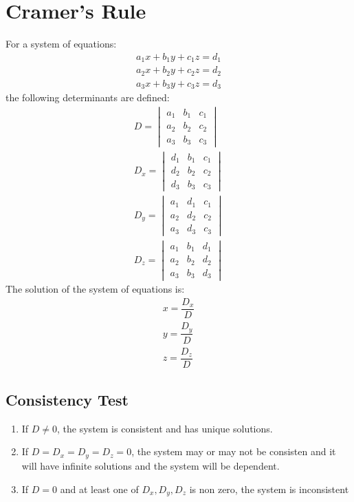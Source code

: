 \documentclass[openany, oneside]{book}
\begin{document}
\section{Cramer's Rule}
For a system of equations:
\begin{align}
a_1x+b_1y+c_1z=d_1\nonumber\\
a_2x+b_2y+c_2z=d_2\nonumber\\
a_3x+b_3y+c_3z=d_3\nonumber
\end{align}
the following determinants are defined:
\begin{align}
D=\begin{vmatrix}a_1&b_1&c_1\\a_2&b_2&c_2\\a_3&b_3&c_3\end{vmatrix}\nonumber\\
D_x=\begin{vmatrix}d_1&b_1&c_1\\d_2&b_2&c_2\\d_3&b_3&c_3\end{vmatrix}\nonumber\\
D_y=\begin{vmatrix}a_1&d_1&c_1\\a_2&d_2&c_2\\a_3&d_3&c_3\end{vmatrix}\nonumber\\
D_z=\begin{vmatrix}a_1&b_1&d_1\\a_2&b_2&d_2\\a_3&b_3&d_3\end{vmatrix}\nonumber
\end{align}
The solution of the system of equations is:
\begin{align}
x=\dfrac{D_x}{D}\\
y=\dfrac{D_y}{D}\\
z=\dfrac{D_z}{D}
\end{align}
\subsection{Consistency Test}
\begin{enumerate}
\item If $D\neq0$, the system is consistent and has unique solutions.
\item If $D=D_x=D_y=D_z=0$, the system may or may not be consisten and it will have infinite solutions and the system will be dependent.
\item If $D=0$ and at least one of $D_x, D_y, D_z$ is non zero, the system is inconsistent
\end{enumerate}
\end{document}
